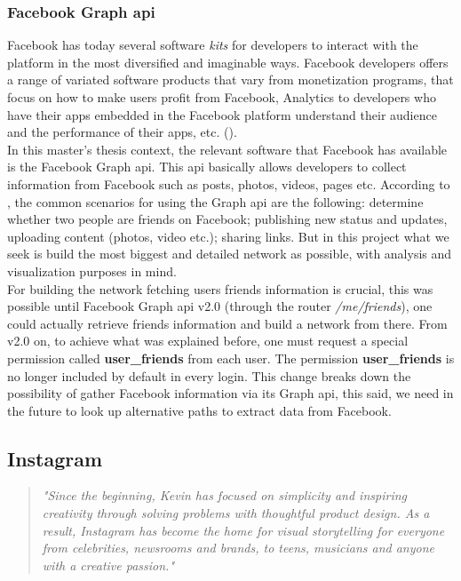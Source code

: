 \subsubsection*{Facebook Graph \gls{api}}
Facebook has today several software \textit{kits} for developers to interact with the platform in the most diversified and imaginable ways. Facebook developers
offers a range of variated software products that vary from monetization programs, that focus on how to make users profit from Facebook, Analytics to developers who
have their apps embedded in the Facebook platform understand their audience and the performance of their apps, etc. (\cite{fbproducts}).\\
\indent In this master's thesis context, the relevant software that Facebook has available is the Facebook Graph \gls{api}. This \gls{api} basically allows developers to collect information
from Facebook such as posts, photos, videos, pages etc. According to \cite{fbgapi}, the common scenarios for using the Graph \gls{api}
are the following: determine whether two people are friends on Facebook; publishing new status and updates, uploading content (photos, video etc.); sharing links. But in this project what we seek is
build the most biggest and detailed network as possible, with analysis and visualization purposes in mind.\\
\indent For building the network fetching users friends information is crucial, this was possible until Facebook Graph \gls{api} v2.0 (through the router \textit{/me/friends}), one could actually retrieve
friends information and build a network from there. From v2.0 on, to achieve what was explained before, one must request a special permission called \textbf{user\_friends}
from each user. The permission \textbf{user\_friends} is no longer included by default in every login. This change breaks down the possibility of gather Facebook information via its Graph \gls{api},
this said, we need in the future to look up alternative paths to extract data from Facebook.


\subsection{Instagram}

\begin{quote}
\textit{"Since the beginning, Kevin has focused on simplicity and inspiring creativity through solving problems with thoughtful
product design. As a result, Instagram has become the home for visual storytelling for everyone from celebrities, newsrooms and
brands, to teens, musicians and anyone with a creative passion."} \cite{instabout}
\end{quote}

